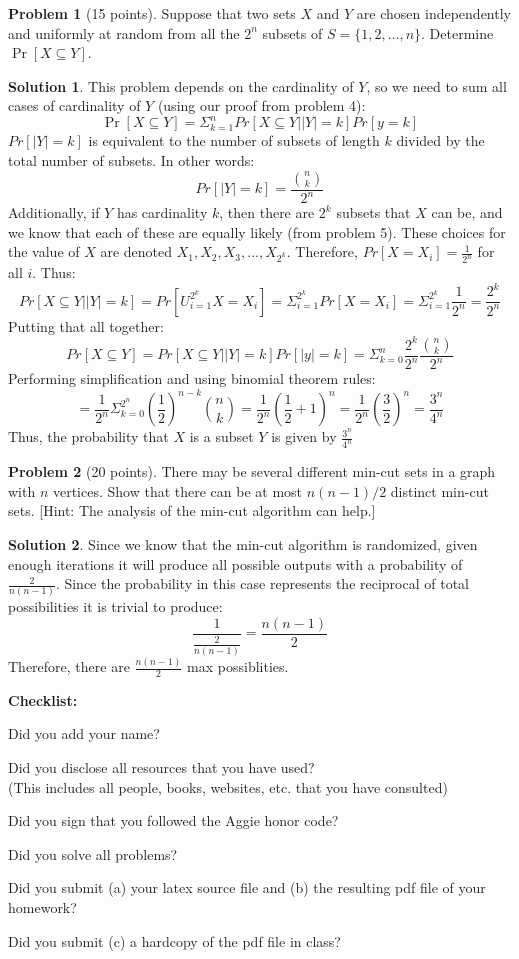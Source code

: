\documentclass{article}
\theoremstyle{definition}
\newtheorem{problem}{Problem}
\newtheorem*{solution}{Solution}
\newcommand{\checklist}{\noindent\textbf{Checklist:}
\begin{compactitem}[$\Box$] 
\item Did you add your name? 
\item Did you disclose all resources that you have used? \\
(This includes all people, books, websites, etc. that you have consulted)
\item Did you sign that you followed the Aggie honor code? 
\item Did you solve all problems? 
\item Did you submit (a) your latex source file and (b) the resulting pdf file
  of your homework?
\item Did you submit (c) a hardcopy of the pdf file in class? 
\end{compactitem}
}
\begin{document}
\begin{problem}[15 points]
Suppose that two sets $X$ and $Y$ are chosen independently and
uniformly at random from all the $2^n$ subsets of $S=\{1,2,\ldots,
n\}$. Determine $\Pr[X\subseteq Y]$. 
\end{problem}
\begin{solution}
This problem depends on the cardinality of $Y$, so we need to sum all cases of cardinality of $Y$ (using our proof from problem 4):
$$ \Pr[X\subseteq Y] = \Sigma_{k=1}^n Pr[X \subseteq Y | |Y| = k] Pr[y = k] $$
$Pr[|Y| = k]$ is equivalent to the number of subsets of length $k$ divided by the total number of subsets. In other words:
$$ Pr[|Y| = k] = \frac{{n \choose k}}{2^n} $$
Additionally, if $Y$ has cardinality $k$, then there are $2^k$ subsets that $X$ can be, and we know that each of these are equally likely (from problem 5). These choices for the value of $X$ are denoted $X_1,X_2,X_3,...,X_{2^k}$. Therefore, $Pr[X=X_i] = \frac{1}{2^n}$ for all $i$. Thus:
$$ Pr[X \subseteq Y | |Y| = k] = Pr[U_{i=1}^{2^k} X = X_i] = \Sigma_{i=1}^{2^k}Pr[X = X_i] = \Sigma_{i=1}^{2^k}\frac{1}{2^n} = \frac{2^k}{2^n} $$
Putting that all together:
$$ Pr[X \subseteq Y] = Pr[X \subseteq Y | |Y| = k]Pr[|y| = k] = \Sigma _{k=0}^n \frac{2^k}{2^n} \frac{{n \choose k}}{2^n}$$
Performing simplification and using binomial theorem rules:
$$ = \frac{1}{2^n} \Sigma_{k=0}^{2^n} (\frac{1}{2})^{n-k} {n \choose k} = \frac{1}{2^n} (\frac{1}{2} + 1)^n = \frac{1}{2^n} (\frac{3}{2})^n = \frac{3^n}{4^n} $$
Thus, the probability that $X$ is a subset $Y$ is given by $\frac{3^n}{4^n}$
\end{solution}

\begin{problem}[20 points]
There may be several different min-cut sets in a graph with $n$ vertices. Show that
there can be at most $n(n-1)/2$ distinct min-cut sets. [Hint: The
analysis of the min-cut algorithm can help.] 
\end{problem}
\begin{solution}
Since we know that the min-cut algorithm is randomized, given enough iterations it will produce all possible outputs with a probability of $\frac{2}{n(n-1)}$. Since the probability in this case represents the reciprocal of total possibilities it is trivial to produce:
$$ \frac{1}{\frac{2}{n(n-1)}} = \frac{n(n-1)}{2}$$
Therefore, there are $\frac{n(n-1)}{2}$ max possiblities.
\end{solution}





\goodbreak
\checklist
\end{document}

